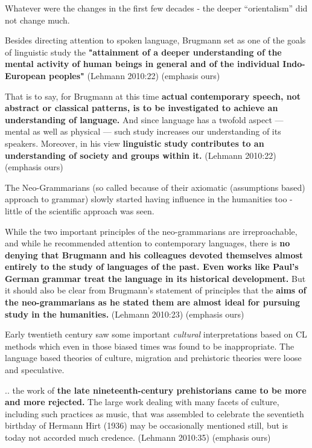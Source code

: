 Whatever were the changes in the first few decades - the deeper “orientalism” did not change much.

\begin{myquote}
Besides directing attention to spoken language, Brugmann set as one of the goals of linguistic study the \textbf{"attainment of a deeper understanding of the mental activity of human beings in general and of the individual Indo-European peoples"} (Lehmann 2010:22) (emphasis ours)
\end{myquote}

\begin{myquote}
That is to say, for Brugmann at this time \textbf{actual contemporary speech, not abstract or classical patterns, is to be investigated to achieve an understanding of language.} And since language has a twofold aspect — mental as well as physical — such study increases our understanding of its speakers. Moreover, in his view \textbf{linguistic study contributes to an understanding of society and groups within it.} (Lehmann 2010:22) (emphasis ours)
\end{myquote}

The Neo-Grammarians (so called because of their axiomatic (assumptions based) approach to grammar) slowly started having influence in the humanities too - little of the scientific approach was seen.

\begin{myquote}
While the two important principles of the neo-grammarians are irreproachable, and while he recommended attention to contemporary languages, there is \textbf{no denying that Brugmann and his colleagues devoted themselves almost entirely to the study of languages of the past. Even works like Paul's German grammar treat the language in its historical development.} But it should also be clear from Brugmann's statement of principles that the \textbf{aims of the neo-grammarians as he stated them are almost ideal for pursuing study in the humanities.} (Lehmann 2010:23) (emphasis ours)
\end{myquote}

Early twentieth century saw some important \textit{cultural} interpretations based on CL methods which even in those biased times was found to be inappropriate. The language based theories of culture, migration and prehistoric theories were loose and speculative.

\begin{myquote}
.. the work of \textbf{the late nineteenth-century prehistorians came to be more and more rejected.} The large work dealing with many facets of culture, including such practices as music, that was assembled to celebrate the seventieth birthday of Hermann Hirt (1936) may be occasionally mentioned still, but is today not accorded much credence. (Lehmann 2010:35) (emphasis ours)
\end{myquote}

